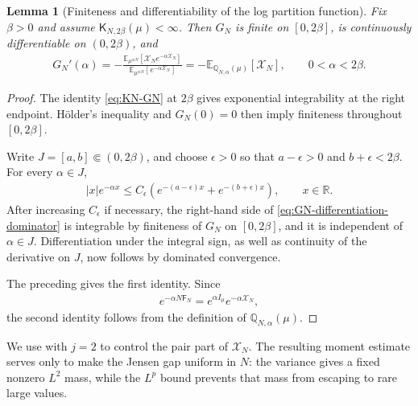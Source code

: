 \documentclass[11pt,reqno]{amsart}
\numberwithin{equation}{section}
\theoremstyle{plain}
\newtheorem{lemma}[lemma]{Lemma}
\theoremstyle{remark}
\newcommand{\R}{{\mathbb{R}}}
\newcommand{\E}{{\mathbb{E}}}
\newcommand{\Q}{{\mathbb{Q}}}
\newcommand{\K}{{\mathsf{K}}}
\newcommand{\Fr}{{\mathsf{F}}}
\newcommand{\be}{\beta}
\begin{document}
\begin{lemma}[Finiteness and differentiability of the log partition function]\label{lem:GN-regularity}
Fix \(\be>0\) and assume \(\K_{N,2\be}(\mu)<\infty\).  Then \(G_N\) is finite on \([0,2\be]\), is continuously differentiable on \((0,2\be)\), and
\begin{align}\label{eq:GN-derivative-justified}
 G_N'(\alpha)
 =-\frac{\E_{\mu^{\otimes N}}\left[\mathcal X_Ne^{-\alpha\mathcal X_N}\right]}
 {\E_{\mu^{\otimes N}}\left[e^{-\alpha\mathcal X_N}\right]}
 =-\E_{\Q_{N,\alpha}(\mu)}[\mathcal X_N],
 \qquad 0<\alpha<2\be.
\end{align}
\end{lemma}

\begin{proof}
The identity \eqref{eq:KN-GN} at \(2\be\) gives exponential integrability at the right endpoint.  H\"older's inequality and \(G_N(0)=0\) then imply finiteness throughout \([0,2\be]\).

Write \(J=[a,b]\Subset(0,2\be)\), and choose \(\epsilon>0\) so that
\(a-\epsilon>0\) and \(b+\epsilon<2\be\).  For every \(\alpha\in J\),
\begin{align}\label{eq:GN-differentiation-dominator}
 |x|e^{-\alpha x}
 \le C_\epsilon\left(e^{-(a-\epsilon)x}+e^{-(b+\epsilon)x}\right),
 \qquad x\in\R.
\end{align}
After increasing \(C_\epsilon\) if necessary, the right-hand side of
\eqref{eq:GN-differentiation-dominator} is integrable by finiteness of \(G_N\)
on \([0,2\be]\), and it is independent of \(\alpha\in J\).  Differentiation
under the integral sign, as well as continuity of the derivative on \(J\),
now follows by dominated convergence.

The preceding gives the first identity.  Since
\begin{align}\label{eq:GN-modulated-exponent-identity}
 e^{-\alpha N\Fr_N}=e^{\alpha I_\mu}e^{-\alpha\mathcal X_N},
\end{align}
the second identity follows from the definition of \(\Q_{N,\alpha}(\mu)\).
\end{proof}


We use  with \(j=2\) to control the pair part of \(\mathcal X_N\).  The resulting moment estimate serves only to make the Jensen gap uniform in \(N\): the variance gives a fixed nonzero \(L^2\) mass, while the \(L^p\) bound prevents that mass from escaping to rare large values.
\end{document}
